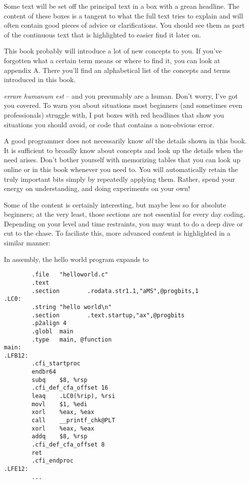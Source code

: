 Some text will be set off the principal text in a box with a grean headline. The content of these boxes is a tangent to what the full text tries to explain and will often contain good pieces of advice or clarifications. You should see them as part of the continuous text that is highlighted to easier find it later on.

\begin{hintbox}
This book probably will introduce a lot of new concepts to you. If you've forgotten what a certain term means or where to find it, you can look at appendix A. There you'll find an alphabetical list of the concepts and terms introduced in this book.
\end{hintbox}

\emph{errare humanum est} -- and you presumably are a human. Don't worry, I've got you covered. To warn you about situations most beginners (and sometimes even professionals) struggle with, I put boxes with red headlines that show you situations you should avoid, or code that contains a non-obvious error.

\begin{warnbox}
A good programmer does not necessarily know \emph{all} the details shown in this book. It is sufficient to broadly know about concepts and look up the details when the need arises. Don't bother yourself with memorizing tables that you can look up online or in this book whenever you need to. You will automatically retain the truly important bits simply by repeatedly applying them. Rather, spend your energy on understanding, and doing experiments on your own!
\end{warnbox}

Some of the content is certainly interesting, but maybe less so for absolute beginners; at the very least, those sections are not essential for every day coding. Depending on your level and time restraints, you may want to do a deep dive or cut to the chase. To faciliate this, more advanced content is highlighted in a similar manner:
\begin{plusbox}
In assembly, the hello world program expands to
\begin{codebox}[helloworld.s]
\begin{verbatim}
        .file   "helloworld.c"
        .text
        .section        .rodata.str1.1,"aMS",@progbits,1
.LC0:
        .string "hello world\n"
        .section        .text.startup,"ax",@progbits
        .p2align 4
        .globl  main
        .type   main, @function
main:
.LFB12:
        .cfi_startproc
        endbr64
        subq    $8, %rsp
        .cfi_def_cfa_offset 16
        leaq    .LC0(%rip), %rsi
        movl    $1, %edi
        xorl    %eax, %eax
        call    __printf_chk@PLT
        xorl    %eax, %eax
        addq    $8, %rsp
        .cfi_def_cfa_offset 8
        ret
        .cfi_endproc
.LFE12:
        ...
\end{verbatim}
\end{codebox}
\end{plusbox}

